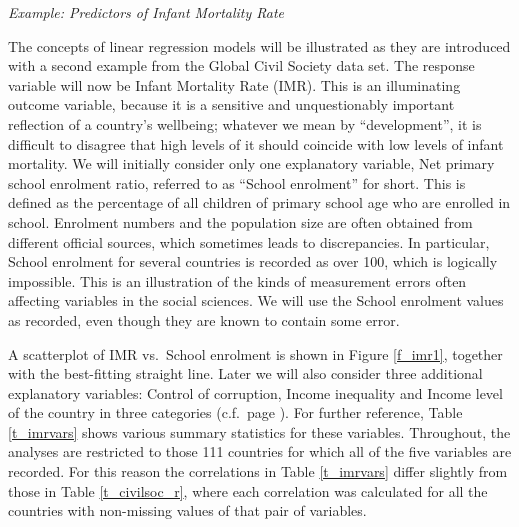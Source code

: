 \newpage
\emph{Example: Predictors of Infant Mortality Rate}

The concepts of linear regression models will be illustrated as they are
introduced with a second example from the Global Civil Society data set.
The response variable will now be Infant Mortality Rate (IMR). This is
an illuminating outcome variable, because it is a sensitive and
unquestionably important reflection of a country's wellbeing; whatever
we mean by ``development'', it is difficult to disagree that high levels
of it should coincide with low levels of infant mortality. We will
initially consider only one explanatory variable, Net primary school
enrolment ratio, referred to as ``School enrolment'' for short. This is
defined as the percentage of all children of primary school age who are
enrolled in school. Enrolment numbers and the population size are
often obtained from different official sources, which sometimes leads to
discrepancies. In particular, School enrolment for several countries is
recorded as over 100, which is logically impossible. This is an
illustration of the kinds of measurement errors often affecting
variables in the social sciences. We will use the School enrolment
values as recorded, even though they are known to contain some error.

A scatterplot of IMR vs.\ School enrolment is shown in Figure
\ref{f_imr1}, together with the best-fitting straight line. Later
we will also consider three additional explanatory variables:
Control of corruption, Income inequality and Income level of the country
in three categories (c.f.\ page \pageref{p_civilsoc}). For further
reference, Table \ref{t_imrvars} shows various summary statistics for
these variables. Throughout, the analyses are restricted to those 111
countries for which all of the five variables are recorded. For this
reason the correlations in Table \ref{t_imrvars} differ slightly from
those in Table \ref{t_civilsoc_r}, where each correlation was calculated
for all the countries with non-missing values of that pair of
variables.


